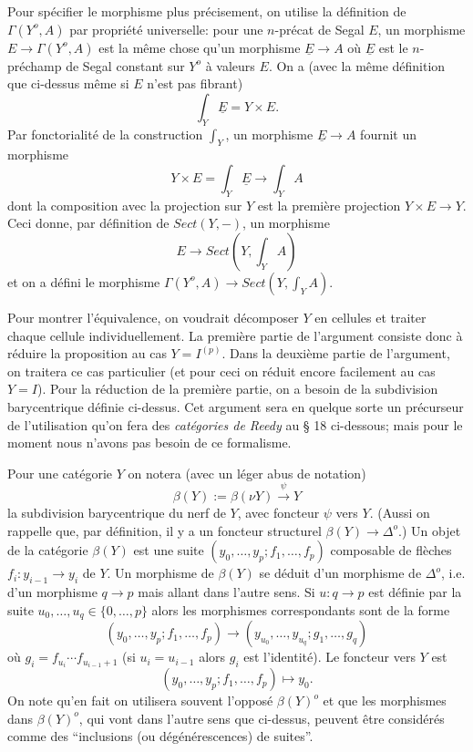 \documentclass[12pt]{article}
\begin{document}
Pour sp\'ecifier le morphisme plus pr\'ecisement, on utilise la d\'efinition de
$\Gamma (Y^o, A)$ par propri\'et\'e universelle: pour une $n$-pr\'ecat de Segal
$E$, un morphisme $E\rightarrow \Gamma (Y^o , A)$ est la m\^eme chose qu'un
morphisme $\underline{E}\rightarrow A$ o\`u $\underline{E}$ est le
$n$-pr\'echamp
de Segal constant sur $Y^o$ \`a valeurs $E$. On a (avec la m\^eme d\'efinition
que ci-dessus m\^eme si $E$ n'est pas fibrant)
$$
\int _Y\underline{E} = Y\times E.
$$
Par fonctorialit\'e de la construction $\int _Y$, un morphisme
$\underline{E}\rightarrow A$ fournit un morphisme
$$
Y\times E =\int _Y\underline{E} \rightarrow \int _YA
$$
dont la composition avec la projection sur $Y$ est la premi\`ere projection
$Y\times E\rightarrow Y$. Ceci donne, par d\'efinition de $Sect (Y, -)$, un
morphisme
$$
E\rightarrow Sect (Y, \int _YA)
$$
et on a d\'efini le morphisme $\Gamma (Y^o, A)\rightarrow Sect (Y, \int _YA)$.


Pour montrer l'\'equivalence,
on voudrait d\'ecomposer $Y$ en cellules et traiter chaque cellule
individuellement. La premi\`ere partie de l'argument consiste donc \`a r\'eduire
la proposition au cas $Y=I^{(p)}$.  Dans la deuxi\`eme partie de l'argument,
on traitera ce cas particulier (et pour ceci on r\'eduit encore facilement
au cas
$Y=I$). Pour la r\'eduction de la premi\`ere partie, on a besoin de la
subdivision
barycentrique d\'efinie ci-dessus. Cet argument sera en quelque sorte un
pr\'ecurseur de l'utilisation qu'on fera des {\em cat\'egories de Reedy} au \S
18 ci-dessous; mais pour le moment nous n'avons pas besoin de ce formalisme.

Pour une cat\'egorie $Y$ on notera (avec un l\'eger abus de notation)
$$
\beta (Y):= \beta (\nu Y)\stackrel{\psi}{\rightarrow} Y
$$
la subdivision barycentrique du nerf de $Y$, avec foncteur $\psi$ vers $Y$.
(Aussi on rappelle que, par d\'efinition, il y a un foncteur structurel
$\beta (Y)\rightarrow \Delta ^o$.) Un
objet de la cat\'egorie $\beta (Y)$ est une suite $(y_0,\ldots , y_p;
f_1,\ldots , f_p)$ composable de fl\`eches $f_i: y_{i-1}\rightarrow y_i$ de $Y$.
Un morphisme de $\beta (Y)$ se d\'eduit d'un morphisme de $\Delta ^o$, i.e. d'un
morphisme $q\rightarrow p$ mais allant dans l'autre sens.
Si $u: q\rightarrow p$ est d\'efinie par la suite $u_0,\ldots , u_q\in \{
0,\ldots , p\}$ alors les morphismes correspondants sont de la forme
$$
(y_0,\ldots , y_p;
f_1,\ldots , f_p)\rightarrow (y_{u_0}, \ldots , y_{u_q};
g_1, \ldots , g_q)
$$
o\`u $g_i = f_{u_i} \cdots f_{u_{i-1}+1}$ (si $u_i=u_{i-1}$ alors $g_i$ est
l'identit\'e). Le foncteur vers $Y$ est
$$
(y_0,\ldots , y_p;
f_1,\ldots , f_p)\mapsto y_0.
$$
On note qu'en fait on utilisera souvent l'oppos\'e $\beta (Y)^o$ et que les
morphismes dans $\beta (Y)^o$, qui vont dans l'autre sens que ci-dessus,
peuvent \^etre consid\'er\'es comme des ``inclusions (ou d\'eg\'en\'erescences)
de suites''.
\end{document}
